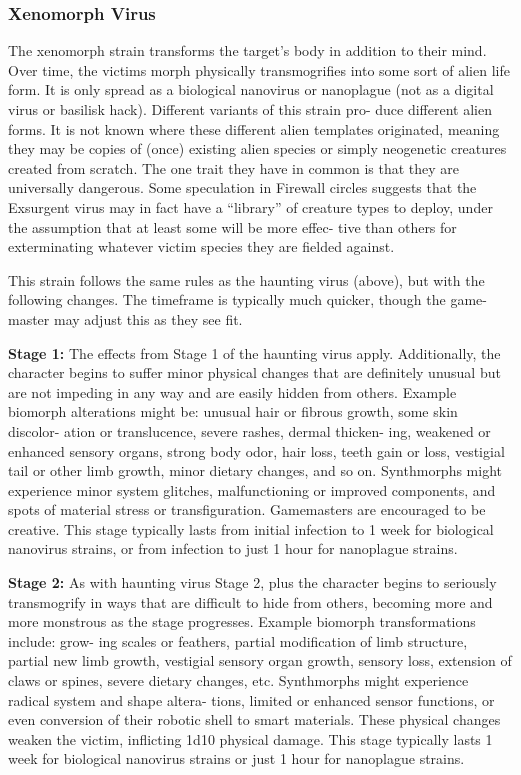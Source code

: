 \subsubsection{Xenomorph Virus}

The xenomorph strain transforms the target's body 
in addition to their mind. Over time, the victims 
morph physically transmogrifies into some sort 
of alien life form. It is only spread as a biological 
nanovirus or nanoplague (not as a digital virus or 
basilisk hack). Different variants of this strain pro-
duce different alien forms. It is not known where 
these different alien templates originated, meaning 
they may be copies of (once) existing alien species 
or simply neogenetic creatures created from scratch. 
The one trait they have in common is that they are 
universally dangerous. Some speculation in Firewall 
circles suggests that the Exsurgent virus may in fact 
have a ``library'' of creature types to deploy, under 
the assumption that at least some will be more effec-
tive than others for exterminating whatever victim 
species they are fielded against. 

This strain follows the same rules as the haunting 
virus (above), but with the following changes. The 
timeframe is typically much quicker, though the game-
master may adjust this as they see fit.

\textbf{Stage 1:} The effects from Stage 1 of the haunting 
virus apply. Additionally, the character begins to suffer 
minor physical changes that are definitely unusual but 
are not impeding in any way and are easily hidden 
from others. Example biomorph alterations might be: 
unusual hair or fibrous growth, some skin discolor-
ation or translucence, severe rashes, dermal thicken-
ing, weakened or enhanced sensory organs, strong 
body odor, hair loss, teeth gain or loss, vestigial tail or 
other limb growth, minor dietary changes, and so on. 
Synthmorphs might experience minor system glitches, 
malfunctioning or improved components, and spots 
of material stress or transfiguration.  Gamemasters 
are encouraged to be creative. This stage typically 
lasts from initial infection to 1 week for biological 
nanovirus strains, or from infection to just 1 hour for 
nanoplague strains.

\textbf{Stage 2:} As with haunting virus Stage 2, plus the 
character begins to seriously transmogrify in ways 
that are difficult to hide from others, becoming 
more and more monstrous as the stage progresses. 
Example biomorph transformations include: grow-
ing scales or feathers, partial modification of limb 
structure, partial new limb growth, vestigial sensory 
organ growth, sensory loss, extension of claws or 
spines, severe dietary changes, etc. Synthmorphs 
might experience radical system and shape altera-
tions, limited or enhanced sensor functions, or even 
conversion of their robotic shell to smart materials. 
These physical changes weaken the victim, inflicting 
1d10 physical damage. This stage typically lasts 1 
week for biological nanovirus strains or just 1 hour 
for nanoplague strains.

